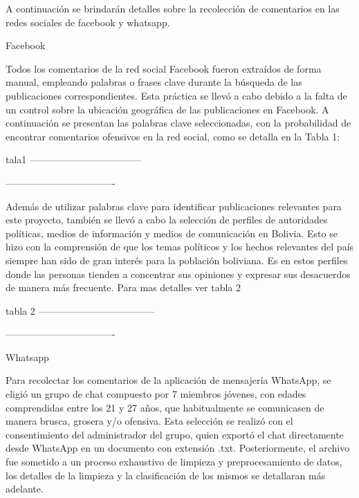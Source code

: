 A continuación se brindarán detalles sobre la recolección de comentarios en las redes sociales de facebook y whatsapp.

Facebook

Todos los comentarios de la red social Facebook fueron extraídos de forma manual, empleando palabras o frases clave durante la búsqueda de las publicaciones correspondientes. Esta práctica se llevó a cabo debido a la falta de un control sobre la ubicación geográfica de las publicaciones en Facebook. A continuación se presentan las palabras clave seleccionadas, con la probabilidad de encontrar comentarios ofensivos en la red social, como se detalla en la Tabla 1:

tala1
-----------------------------------



----------------------------------


Además de utilizar palabras clave para identificar publicaciones relevantes para este proyecto, también se llevó a cabo la selección de perfiles de autoridades políticas, medios de información y medios de comunicación en Bolivia. Esto se hizo con la comprensión de que los temas políticos y los hechos relevantes del país siempre han sido de gran interés para la población boliviana. Es en estos perfiles donde las personas tienden a concentrar sus opiniones y expresar sus desacuerdos de manera más frecuente. Para mas detalles ver tabla 2


tabla 2
------------------------------------




----------------------------------

Whatsapp


Para recolectar los comentarios de la aplicación de mensajería WhatsApp, se eligió un grupo de chat compuesto por 7 miembros jóvenes, con edades comprendidas entre los 21 y 27 años, que habitualmente se comunicasen de manera brusca, grosera y/o ofensiva. Esta selección se realizó con el consentimiento del administrador del grupo, quien exportó el chat directamente desde WhatsApp en un documento con extensión .txt. Posteriormente, el archivo fue sometido a un proceso exhaustivo de limpieza y preprocesamiento de datos, los detalles de la limpieza y la clasificación de los mismos se detallaran más  adelante.

